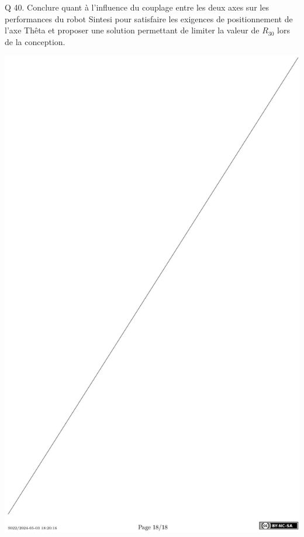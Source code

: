 \documentclass[10pt]{article}
\begin{document}
Q 40. Conclure quant à l'influence du couplage entre les deux axes sur les performances du robot Sintesi pour satisfaire les exigences de positionnement de l'axe Thêta et proposer une solution permettant de limiter la valeur de $R_{30}$ lors de la conception.

\begin{center}
\includegraphics[max width=\textwidth]{2024_07_14_db927ae3a82093776e19g-18}
\end{center}
\end{document}
